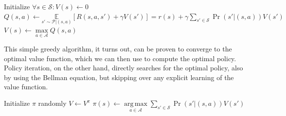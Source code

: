 \documentclass{article}
\DeclareMathOperator*{\argmax}{arg\,max}
\begin{document}
\begin{algorithmic}
        \State Initialize $ \forall s \in \mathcal{S}: V(s) \gets 0 $
                    \State $ Q(s, a) \gets \underset{s' \sim \mathcal{P} | (s, a)}{\mathbb{E}} [ R(s, a, s') + \gamma V(s') ] = r(s) + \gamma \sum \limits_{s' \in \mathcal{S}} \Pr(s' | (s, a)) V(s') $
                \EndFor
                \State $ V(s) \gets \max \limits_{a \in \mathcal{A}} Q(s, a) $
            \EndFor
        \EndWhile
    \EndProcedure
\end{algorithmic}

This simple greedy algorithm, it turns out, can be proven to converge to the optimal value function, which we can then use to compute the optimal policy. Policy iteration, on the other hand, directly searches for the optimal policy, also by using the Bellman equation, but skipping over any explicit learning of the value function.

\begin{algorithmic}
        \State Initialize $ \pi $ randomly
            \State $ V \gets V^\pi $
                \State $ \pi(s) \gets \argmax \limits_{a \in \mathcal{A}} \sum \limits_{s' \in \mathcal{S}} \Pr(s' | (s, a)) V(s') $
            \EndFor
        \EndWhile
    \EndProcedure
\end{algorithmic}
\end{document}

